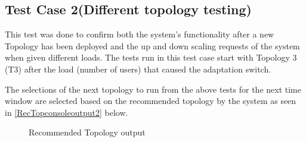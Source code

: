 \subsection{Test Case 2(Different topology testing)}
This test was done to confirm both the system's functionality after a new Topology has been deployed and the up and down scaling requests of the system when given different loads. The tests run in this test case start with Topology 3 (T3) after the load (number of users) that caused the adaptation switch.
\begin{table}[H]
\caption{Test case 2 run on the application.}
\label{systest1}
\end{table}

The selections of the next topology to run from the above tests for the next time window are selected based on the recommended topology by the system as seen in \autoref{RecTopconsoleoutput2} below. 

\begin{figure} [H]
   \centering 
   \hfill
   \caption{ Recommended Topology output} 
   \label{RecTopconsoleoutput2} 
\end{figure}


